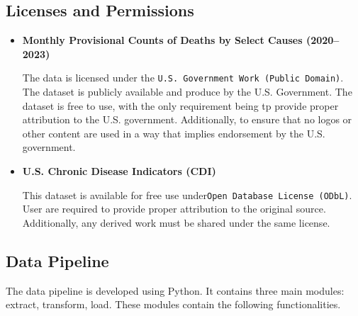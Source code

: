 \documentclass[a4paper,10pt]{article}
\begin{document}
	\subsection{Licenses and Permissions}
	\begin{itemize}
	\item \textbf{Monthly Provisional Counts of Deaths by Select Causes (2020--2023)}
	
	The data is licensed under the \texttt{U.S. Government Work (Public Domain)}. The dataset is publicly available and produce by the U.S. Government. The dataset is free to use, with the only requirement being tp provide proper attribution to the U.S. government. Additionally, to ensure that no logos or other content are used in a way that implies endorsement by the U.S. government. \cite{licenses2}
	\end{itemize}
	
	\begin{itemize}
	\item \textbf{U.S. Chronic Disease Indicators (CDI)} 
		
	This dataset is available for free use under\texttt{Open Database License (ODbL)}. User are required to provide proper attribution to the original source. Additionally, any derived work must be shared under the same license. \cite{licenses1}
		
	\end{itemize}


	\subsection{Data Pipeline}
The data pipeline is developed using Python. It contains three main modules: extract, transform, load. These modules contain the following functionalities.
 
\end{document}
